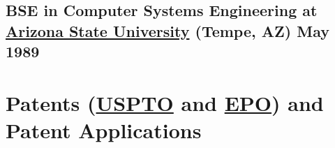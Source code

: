\documentclass[10pt,letterpaper,oneside]{report}
\begin{document}
\medskip

\begin{minipage}{\textwidth}
  \subsection[BSE in Computer Systems Engineering]{
    BSE in Computer Systems Engineering at
    \href{https://engineering.asu.edu/undergraduate-degree-programs}
    {Arizona State University} {\small (Tempe, AZ)} \hfill May 1989
  }
\end{minipage}

\section[Patents (USPTO and EPO) and Patent Applications]{
  Patents
  (\href{http://patft.uspto.gov/netacgi/nph-Parser?Sect1=PTO2&Sect2=HITOFF&p=1&u=/netahtml/PTO/search-bool.html&r=0&f=S&l=50&TERM1=voltz&FIELD1=INNM&co1=AND&TERM2=christopher&FIELD2=INNM&d=PTXT}
  {USPTO} and
  \href{http://v3.espacenet.com/searchResults?locale=en_EP&ST=quick&IA=voltz+christopher&compact=false&DB=EPODOC&submitted=true}
  {EPO})
  and Patent Applications
}
\end{document}
